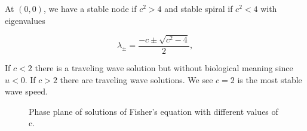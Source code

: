 \documentclass[]{article}
\numberwithin{equation}{section}		%
\begin{document}
\begin{enumerate}
At $(0,0)$, we have a stable node if $c^2 >4$ and stable spiral if $c^2 < 4$ with eigenvalues

\begin{equation*}
\lambda_{\pm}=\frac{-c\pm \sqrt{c^2-4}}{2}, \end{equation*}

If $c<2$ there is a traveling wave solution but without biological meaning since $u<0$. If $c>2$ there are traveling wave solutions. We see $c=2$ is the most stable wave speed.

\begin{figure}[tbh]
\begin{centering}
\par\end{centering}
\caption{\label{figure:PF}Phase plane of solutions of Fisher's equation with different values of c.}
\end{figure}
\end{enumerate}
\end{document}
